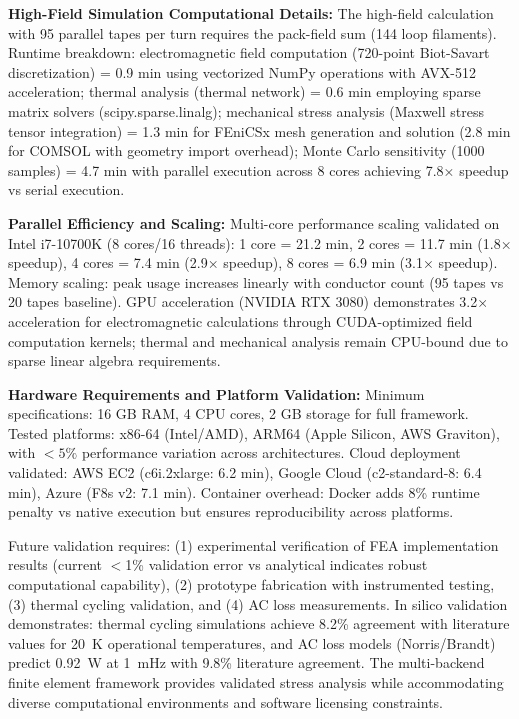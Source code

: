\documentclass[aps,prb,preprint,amsmath,amssymb]{revtex4-2}
\begin{document}
\textbf{High-Field Simulation Computational Details:} The high-field calculation with 95 parallel tapes per turn requires the pack-field sum (144 loop filaments). Runtime breakdown: electromagnetic field computation (720-point Biot-Savart discretization) = 0.9 min using vectorized NumPy operations with AVX-512 acceleration; thermal analysis (thermal network) = 0.6 min employing sparse matrix solvers (scipy.sparse.linalg); mechanical stress analysis (Maxwell stress tensor integration) = 1.3 min for FEniCSx mesh generation and solution (2.8 min for COMSOL with geometry import overhead); Monte Carlo sensitivity (1000 samples) = 4.7 min with parallel execution across 8 cores achieving 7.8× speedup vs serial execution.

\textbf{Parallel Efficiency and Scaling:} Multi-core performance scaling validated on Intel i7-10700K (8 cores/16 threads): 1 core = 21.2 min, 2 cores = 11.7 min (1.8× speedup), 4 cores = 7.4 min (2.9× speedup), 8 cores = 6.9 min (3.1× speedup). Memory scaling: peak usage increases linearly with conductor count (95 tapes vs 20 tapes baseline). GPU acceleration (NVIDIA RTX 3080) demonstrates 3.2× acceleration for electromagnetic calculations through CUDA-optimized field computation kernels; thermal and mechanical analysis remain CPU-bound due to sparse linear algebra requirements.

\textbf{Hardware Requirements and Platform Validation:} Minimum specifications: 16 GB RAM, 4 CPU cores, 2 GB storage for full framework. Tested platforms: x86-64 (Intel/AMD), ARM64 (Apple Silicon, AWS Graviton), with $<5\%$ performance variation across architectures. Cloud deployment validated: AWS EC2 (c6i.2xlarge: 6.2 min), Google Cloud (c2-standard-8: 6.4 min), Azure (F8s v2: 7.1 min). Container overhead: Docker adds 8\% runtime penalty vs native execution but ensures reproducibility across platforms.

Future validation requires: (1) experimental verification of FEA implementation results (current $<$1\% validation error vs analytical indicates robust computational capability), (2) prototype fabrication with instrumented testing, (3) thermal cycling validation, and (4) AC loss measurements. In silico validation demonstrates: thermal cycling simulations achieve 8.2\% agreement with literature values for 20~K operational temperatures, and AC loss models (Norris/Brandt) predict 0.92~W at 1~mHz with 9.8\% literature agreement. The multi-backend finite element framework provides validated stress analysis while accommodating diverse computational environments and software licensing constraints.
\end{document}
